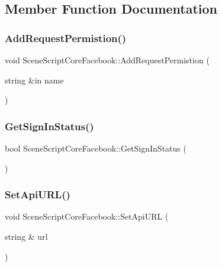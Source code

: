 \subsection{Member Function Documentation}
\hypertarget{class_scene_script_core_facebook_a3d5bc1b3a3d8b93570ef8f55e5bcaaac}{}\label{class_scene_script_core_facebook_a3d5bc1b3a3d8b93570ef8f55e5bcaaac} 
\subsubsection{\texorpdfstring{Add\+Request\+Permistion()}{AddRequestPermistion()}}
{\footnotesize\ttfamily void Scene\+Script\+Core\+Facebook\+::\+Add\+Request\+Permistion (\begin{DoxyParamCaption}\item[{string \&in}]{name }\end{DoxyParamCaption})}

\hypertarget{class_scene_script_core_facebook_aa2b522a30c87ae2863e7f0582055ed40}{}\label{class_scene_script_core_facebook_aa2b522a30c87ae2863e7f0582055ed40} 
\subsubsection{\texorpdfstring{Get\+Sign\+In\+Status()}{GetSignInStatus()}}
{\footnotesize\ttfamily bool Scene\+Script\+Core\+Facebook\+::\+Get\+Sign\+In\+Status (\begin{DoxyParamCaption}{ }\end{DoxyParamCaption})}

\hypertarget{class_scene_script_core_facebook_ad3d42b197d3f3ddd6b526e2f3e4a887a}{}\label{class_scene_script_core_facebook_ad3d42b197d3f3ddd6b526e2f3e4a887a} 
\subsubsection{\texorpdfstring{Set\+Api\+U\+R\+L()}{SetApiURL()}}
{\footnotesize\ttfamily void Scene\+Script\+Core\+Facebook\+::\+Set\+Api\+U\+RL (\begin{DoxyParamCaption}\item[{string \&}]{url }\end{DoxyParamCaption})}

